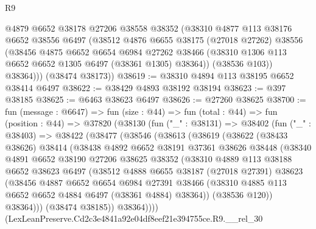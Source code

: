 \begin{lexlean}{R9}
\begin{coremodule}
          @4879
          @6652
          @38178
          @27206
          @38558
          @38352
          (@38310
            @4877
            @113
            @38176
            @6652
            @38556
            @6497
            (@38512
              @4876
              @6655
              @38175
              (@27018 @27262)
              @38556
              (@38456
                @4875
                @6652
                @6654
                @6984
                @27262
                @38466
                (@38310 @1306 @113 @6652 @6652 @1305 @6497 (@38361 @1305) @38364))
              (@38536 @103))
            @38364)))
      (@38474 @38173))
@38619 := @38310 @4894 @113 @38195 @6652 @38414 @6497
@38622 := @38429 @4893 @38192 @38194
@38623 := @397 @38185
@38625 := @6463 @38623 @6497
@38626 := @27260 @38625
@38700 := fun (message : @6647) =>
  fun (size : @44) =>
  fun (total : @44) =>
  fun (position : @44) =>
  @37820
    (@38130
      (fun ("_" : @38131) =>
      @38402
        (fun ("_" : @38403) =>
        @38422
          (@38477
            (@38546
              (@38613
                (@38619
                  (@38622
                    (@38433 @38626)
                    @38414
                    (@38438
                      @4892
                      @6652
                      @38191
                      @37361
                      @38626
                      @38448
                      (@38340
                        @4891
                        @6652
                        @38190
                        @27206
                        @38625
                        @38352
                        (@38310
                          @4889
                          @113
                          @38188
                          @6652
                          @38623
                          @6497
                          (@38512
                            @4888
                            @6655
                            @38187
                            (@27018 @27391)
                            @38623
                            (@38456
                              @4887
                              @6652
                              @6654
                              @6984
                              @27391
                              @38466
                              (@38310 @4885 @113 @6652 @6652 @4884 @6497 (@38361 @4884) @38364))
                            (@38536 @120))
                          @38364)))
                    (@38474 @38185))
                  @38364))))
          (LexLeanPreserve.Cd2c3e4841a92e04df8eef21e394755ce.R9.__rel_30

\end{coremodule}
\end{lexlean}
